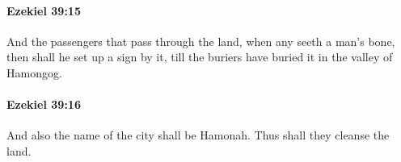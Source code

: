 		\paragraph{Ezekiel 39:15} %
			\label{EZEKIEL-39-15}

			And the passengers that pass through the land, when any seeth a man’s bone, then shall he set up a sign by it, till the buriers have buried it in the valley of Hamongog.


		\paragraph{Ezekiel 39:16} %
			\label{EZEKIEL-39-16}

			And also the name of the city shall be Hamonah. Thus shall they cleanse the land.


